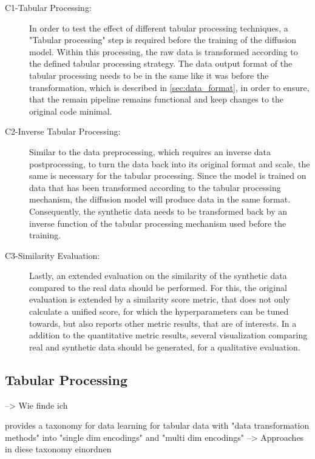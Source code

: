 \begin{description}
    \item[C1-Tabular Processing:] In order to test the effect of different tabular processing techniques, a "Tabular processing" step is required before the training of the diffusion model.
    Within this processing, the raw data is transformed according to the defined tabular processing strategy.
    The data output format of the tabular processing needs to be in the same like it was before the transformation, which is described in \autoref{sec:data_format}, in order to ensure, 
    that the remain pipeline remains functional and keep changes to the original code minimal.
    \item[C2-Inverse Tabular Processing:] Similar to the data preprocessing, which requires an inverse data postprocessing, to turn the data back into its original format and scale, the same is necessary for the tabular processing.
    Since the model is trained on data that has been transformed according to the tabular processing mechanism, the diffusion model will produce data in the same format.
    Consequently, the synthetic data needs to be transformed back by an inverse function of the tabular processing mechanism used before the training.
    \item[C3-Similarity Evaluation:] Lastly, an extended evaluation on the similarity of the synthetic data compared to the real data should be performed.
    For this, the original evaluation is extended by a similarity score metric, that does not only calculate a unified score, for which the hyperparameters can be tuned towards,
    but also reports other metric results, that are of interests.
    In a addition to the quantitative metric results, several visualization comparing real and synthetic data should be generated, for a qualitative evaluation.
\end{description}



\subsection{Tabular Processing}
\label{ch:conceptualDesign-codeExtensions-dataPreprocessing}

--> Wie finde ich

\cite{borisov2022DeepNeuralNetworks} provides a taxonomy for data learning for tabular data with "data transformation methods" into "single dim encodings" and "multi dim encodings" 
--> Approaches in diese taxonomy einordnen


